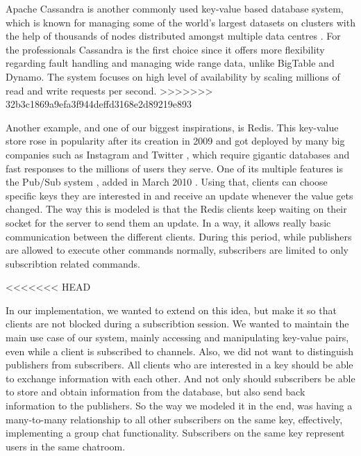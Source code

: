 Apache Cassandra is another commonly used key-value based database system, which is known for managing some of the world's largest datasets on clusters with the help of thousands of nodes distributed amongst multiple data centres \cite{chebotko2015big}. For the professionals Cassandra is the first choice since it offers more flexibility regarding fault handling and managing wide range data, unlike BigTable and Dynamo\cite{kalid2017big}. The system focuses on high level of availability by scaling millions of read and write requests per second.
>>>>>>> 32b3c1869a9efa3f944deffd3168e2d89219e893

Another example, and one of our biggest inspirations, is Redis. This key-value store rose in popularity after its creation in 2009 and got deployed by many big companies such as Instagram \cite{krieger2011instagram} and Twitter \cite{yu2014twitter}, which require gigantic databases and fast responses to the millions of users they serve. One of its multiple features is the Pub/Sub system \cite{redis2020pubsub}, added in March 2010 \cite{sanfilippo2010pubsub}. Using that, clients can choose specific keys they are interested in and receive an update whenever the value gets changed. The way this is modeled is that the Redis clients keep waiting on their socket for the server to send them an update. In a way, it allows really basic communication between the different clients.
During this period, while publishers are allowed to execute other commands normally, subscribers are limited to only subscribtion related commands.

<<<<<<< HEAD

In our implementation, we wanted to extend on this idea, but make it so that clients are not blocked during a subscribtion session. We wanted to maintain the main use case of our system, mainly accessing and manipulating key-value pairs, even while a client is subscribed to channels. Also, we did not want to distinguish publishers from subscribers. All clients who are interested in a key should be able to exchange information with each other.
And not only should subscribers be able to store and obtain information from the database, but also send back information to the publishers. So the way we modeled it in the end, was having a many-to-many relationship to all other subscribers on the same key, effectively, implementing a group chat functionality. Subscribers on the same key represent users in the same chatroom. 

